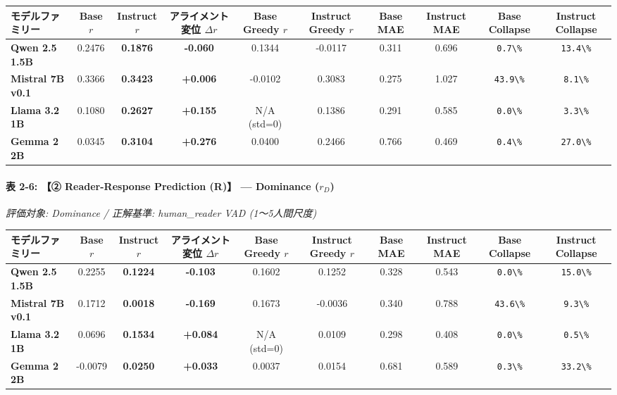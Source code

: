 \begin{center}
\small
\begin{tabular}{lccccccccc}
\toprule
\textbf{モデルファミリー} & \textbf{Base $r$} & \textbf{Instruct $r$} & \textbf{アライメント変位 $\Delta r$} & \textbf{Base Greedy $r$} & \textbf{Instruct Greedy $r$} & \textbf{Base MAE} & \textbf{Instruct MAE} & \textbf{Base Collapse} & \textbf{Instruct Collapse} \\
\midrule
\textbf{Qwen 2.5 1.5B} & 0.2476 & \textbf{0.1876} & \textbf{-0.060} & 0.1344 & -0.0117 & 0.311 & 0.696 & \texttt{0.7\textbackslash{}\%} & \texttt{13.4\textbackslash{}\%} \\
\textbf{Mistral 7B v0.1} & 0.3366 & \textbf{0.3423} & \textbf{+0.006} & -0.0102 & 0.3083 & 0.275 & 1.027 & \texttt{43.9\textbackslash{}\%} & \texttt{8.1\textbackslash{}\%} \\
\textbf{Llama 3.2 1B} & 0.1080 & \textbf{0.2627} & \textbf{+0.155} & N/A (std=0) & 0.1386 & 0.291 & 0.585 & \texttt{0.0\textbackslash{}\%} & \texttt{3.3\textbackslash{}\%} \\
\textbf{Gemma 2 2B} & 0.0345 & \textbf{0.3104} & \textbf{+0.276} & 0.0400 & 0.2466 & 0.766 & 0.469 & \texttt{0.4\textbackslash{}\%} & \texttt{27.0\textbackslash{}\%} \\
\bottomrule
\end{tabular}
\end{center}


\paragraph{表 2-6: 【② Reader-Response Prediction (R)】 — Dominance ($r_D$)}
\textit{評価対象: Dominance / 正解基準: human\_reader VAD (1〜5人間尺度)}

\begin{center}
\small
\begin{tabular}{lccccccccc}
\toprule
\textbf{モデルファミリー} & \textbf{Base $r$} & \textbf{Instruct $r$} & \textbf{アライメント変位 $\Delta r$} & \textbf{Base Greedy $r$} & \textbf{Instruct Greedy $r$} & \textbf{Base MAE} & \textbf{Instruct MAE} & \textbf{Base Collapse} & \textbf{Instruct Collapse} \\
\midrule
\textbf{Qwen 2.5 1.5B} & 0.2255 & \textbf{0.1224} & \textbf{-0.103} & 0.1602 & 0.1252 & 0.328 & 0.543 & \texttt{0.0\textbackslash{}\%} & \texttt{15.0\textbackslash{}\%} \\
\textbf{Mistral 7B v0.1} & 0.1712 & \textbf{0.0018} & \textbf{-0.169} & 0.1673 & -0.0036 & 0.340 & 0.788 & \texttt{43.6\textbackslash{}\%} & \texttt{9.3\textbackslash{}\%} \\
\textbf{Llama 3.2 1B} & 0.0696 & \textbf{0.1534} & \textbf{+0.084} & N/A (std=0) & 0.0109 & 0.298 & 0.408 & \texttt{0.0\textbackslash{}\%} & \texttt{0.5\textbackslash{}\%} \\
\textbf{Gemma 2 2B} & -0.0079 & \textbf{0.0250} & \textbf{+0.033} & 0.0037 & 0.0154 & 0.681 & 0.589 & \texttt{0.3\textbackslash{}\%} & \texttt{33.2\textbackslash{}\%} \\
\bottomrule
\end{tabular}
\end{center}


